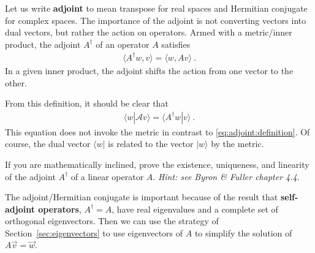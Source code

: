 Let us write \textbf{adjoint} to mean transpose for real spaces and Hermitian conjugate for complex spaces. The importance of the adjoint is not converting vectors into dual vectors, but rather the action on operators. Armed with a metric/inner product, the adjoint $A^\dag$ of an operator $A$ satisfies
\begin{align}
  \langle A^\dag w, v  \rangle
  = 
  \langle w, Av \rangle \ .
  \label{eq:adjoint:definition}
\end{align}
In a given inner product, the adjoint shifts the action from one vector to the other. 
\begin{example}
From this definition, it should be clear that
\begin{align}
  \langle w | \mathcal A v\rangle = \langle A^\dag w | v\rangle \ .
  \label{eq:wAv:Awv}
\end{align}
This equation does not invoke the metric in contrast to \eqref{eq:adjoint:definition}. Of course, the dual vector $\langle w |$ is related to the vector $|w\rangle$ by the metric.
\end{example}
\begin{exercise}
If you are mathematically inclined, prove the existence, uniqueness, and linearity of the adjoint $A^\dag$ of a linear operator $A$. \emph{Hint: see Byron \& Fuller chapter 4.4}. 
\end{exercise}

The adjoint/Hermitian conjugate is important because of the result that \textbf{self-adjoint operators}, $A^\dag = A$, have real eigenvalues and a complete set of orthogonal eigenvectors. Then we can use the strategy of Section~\ref{sec:eigenvectors} to use eigenvectors of $A$ to simplify the solution of $A\vec{v} = \vec{w}$.